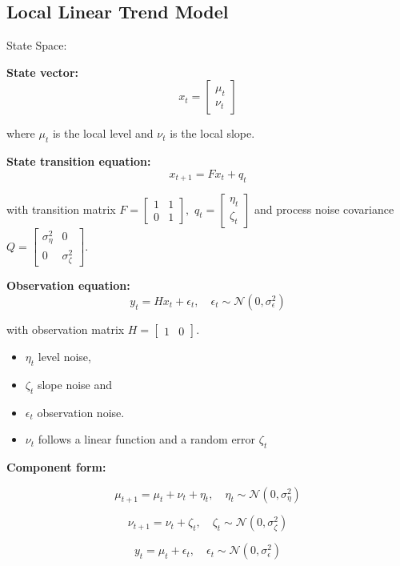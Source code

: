 \subsection*{Local Linear Trend Model}

State Space: 

\textbf{State vector:}
\[x_t= \begin{bmatrix} 
                \mu_t \\ 
                \nu_t 
            \end{bmatrix}\]

where $\mu_t$ is the local level and $\nu_t$ is the local slope.

\textbf{State transition equation:}
$$x_{t+1} = Fx_t + q_t$$ 

with transition matrix
$F=\begin{bmatrix} 
        1 & 1 \\ 
        0 & 1
    \end{bmatrix},$
$q_t = \begin{bmatrix}
    \eta_t \\ \zeta_t
\end{bmatrix}$
and process noise covariance
$Q=\begin{bmatrix} 
        \sigma^2_\eta & 0 \\ 
        0 & \sigma^2_\zeta 
    \end{bmatrix}.$
    
\textbf{Observation equation:}
$$y_t = Hx_t+\epsilon_t, \quad \epsilon_t \sim \mathcal{N}(0, \sigma^2_\epsilon)$$ 

with observation matrix $H=\begin{bmatrix} 1 & 0 \end{bmatrix}.$

\begin{itemize}
    \item $\eta_t$ level noise, 
    \item $\zeta_t$ slope noise and
    \item $\epsilon_t$ observation noise. 

    \item $\nu_t$ follows a linear function and a random error $\zeta_t$
\end{itemize}

\textbf{Component form:}

$$\mu_{t+1} = \mu_t + \nu_t + \eta_t, \quad \eta_t \sim \mathcal{N}(0, \sigma^2_\eta)$$ 

$$\nu_{t+1} = \nu_t + \zeta_t, \quad \zeta_t \sim \mathcal{N}(0, \sigma^2_\zeta)$$ 

$$y_t= \mu_t+\epsilon_t, \quad \epsilon_t \sim \mathcal{N}(0, \sigma^2_\epsilon)$$ 

